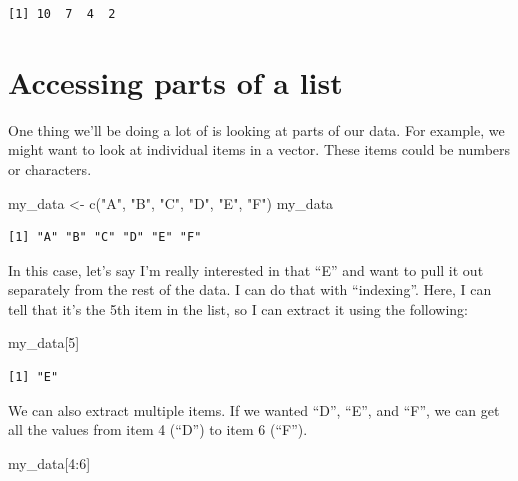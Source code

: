 \documentclass[
  letterpaper,
  DIV=11,
  numbers=noendperiod]{scrreprt}
\newenvironment{Shaded}{\begin{snugshade}}{\end{snugshade}}
\newcommand{\DecValTok}[1]{\textcolor[rgb]{0.68,0.00,0.00}{#1}}
\newcommand{\FunctionTok}[1]{\textcolor[rgb]{0.28,0.35,0.67}{#1}}
\newcommand{\NormalTok}[1]{\textcolor[rgb]{0.00,0.23,0.31}{#1}}
\newcommand{\OtherTok}[1]{\textcolor[rgb]{0.00,0.23,0.31}{#1}}
\newcommand{\SpecialCharTok}[1]{\textcolor[rgb]{0.37,0.37,0.37}{#1}}
\newcommand{\StringTok}[1]{\textcolor[rgb]{0.13,0.47,0.30}{#1}}
\begin{document}
\begin{verbatim}
[1] 10  7  4  2
\end{verbatim}

\section{Accessing parts of a list}\label{accessing-parts-of-a-list}

One thing we'll be doing a lot of is looking at parts of our data. For
example, we might want to look at individual items in a vector. These
items could be numbers or characters.

\begin{Shaded}
\begin{Highlighting}[]
\NormalTok{my\_data }\OtherTok{\textless{}{-}} \FunctionTok{c}\NormalTok{(}\StringTok{"A"}\NormalTok{, }\StringTok{"B"}\NormalTok{, }\StringTok{"C"}\NormalTok{, }\StringTok{"D"}\NormalTok{, }\StringTok{"E"}\NormalTok{, }\StringTok{"F"}\NormalTok{)}
\NormalTok{my\_data}
\end{Highlighting}
\end{Shaded}

\begin{verbatim}
[1] "A" "B" "C" "D" "E" "F"
\end{verbatim}

In this case, let's say I'm really interested in that ``E'' and want to
pull it out separately from the rest of the data. I can do that with
``indexing''. Here, I can tell that it's the 5th item in the list, so I
can extract it using the following:

\begin{Shaded}
\begin{Highlighting}[]
\NormalTok{my\_data[}\DecValTok{5}\NormalTok{]}
\end{Highlighting}
\end{Shaded}

\begin{verbatim}
[1] "E"
\end{verbatim}

We can also extract multiple items. If we wanted ``D'', ``E'', and
``F'', we can get all the values from item 4 (``D'') to item 6 (``F'').

\begin{Shaded}
\begin{Highlighting}[]
\NormalTok{my\_data[}\DecValTok{4}\SpecialCharTok{:}\DecValTok{6}\NormalTok{]}
\end{Highlighting}
\end{Shaded}
\end{document}
